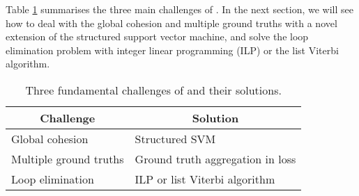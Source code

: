 

Table \ref{tbl:challenges} summarises the three main challenges of {\seqrec}.
In the next section, we will see how to deal with the global cohesion and multiple ground truths with a novel extension of 
the structured support vector machine,
and solve the loop elimination problem with integer linear programming (ILP) or the list Viterbi algorithm.

\begin{table}[!h]
	\centering
	\begin{tabular}{ll}
	\hline
	\hline
	\multicolumn{1}{c}{\bf Challenge} & \multicolumn{1}{c}{\bf Solution}            \\ \hline
	Global cohesion                    & Structured SVM                             \\ \hline
	Multiple ground truths             & Ground truth aggregation in loss 			\\ \hline
	Loop elimination                   & ILP or list Viterbi algorithm                		\\ \hline  
	\end{tabular}
	\caption{Three fundamental challenges of {\seqrec} and their solutions.}
	\label{tbl:challenges}
\end{table}


